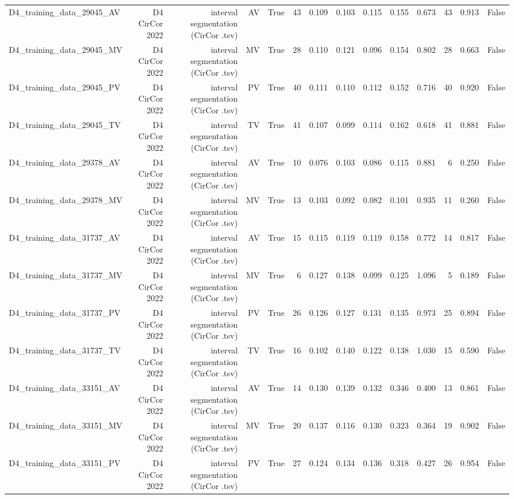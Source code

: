 \begin{table}[htbp]
\begin{tabular}{lrrrrrrrrrrrrr}
    D4\_training\_data\_29045\_AV & D4 CirCor 2022 & interval segmentation (CirCor .tsv) & AV & True & 43 & 0.109 & 0.103 & 0.115 & 0.155 & 0.673 & 43 & 0.913 & False \\
    D4\_training\_data\_29045\_MV & D4 CirCor 2022 & interval segmentation (CirCor .tsv) & MV & True & 28 & 0.110 & 0.121 & 0.096 & 0.154 & 0.802 & 28 & 0.663 & False \\
    D4\_training\_data\_29045\_PV & D4 CirCor 2022 & interval segmentation (CirCor .tsv) & PV & True & 40 & 0.111 & 0.110 & 0.112 & 0.152 & 0.716 & 40 & 0.920 & False \\
    D4\_training\_data\_29045\_TV & D4 CirCor 2022 & interval segmentation (CirCor .tsv) & TV & True & 41 & 0.107 & 0.099 & 0.114 & 0.162 & 0.618 & 41 & 0.881 & False \\
    D4\_training\_data\_29378\_AV & D4 CirCor 2022 & interval segmentation (CirCor .tsv) & AV & True & 10 & 0.076 & 0.103 & 0.086 & 0.115 & 0.881 & 6 & 0.250 & False \\
    D4\_training\_data\_29378\_MV & D4 CirCor 2022 & interval segmentation (CirCor .tsv) & MV & True & 13 & 0.103 & 0.092 & 0.082 & 0.101 & 0.935 & 11 & 0.260 & False \\
    D4\_training\_data\_31737\_AV & D4 CirCor 2022 & interval segmentation (CirCor .tsv) & AV & True & 15 & 0.115 & 0.119 & 0.119 & 0.158 & 0.772 & 14 & 0.817 & False \\
    D4\_training\_data\_31737\_MV & D4 CirCor 2022 & interval segmentation (CirCor .tsv) & MV & True & 6 & 0.127 & 0.138 & 0.099 & 0.125 & 1.096 & 5 & 0.189 & False \\
    D4\_training\_data\_31737\_PV & D4 CirCor 2022 & interval segmentation (CirCor .tsv) & PV & True & 26 & 0.126 & 0.127 & 0.131 & 0.135 & 0.973 & 25 & 0.894 & False \\
    D4\_training\_data\_31737\_TV & D4 CirCor 2022 & interval segmentation (CirCor .tsv) & TV & True & 16 & 0.102 & 0.140 & 0.122 & 0.138 & 1.030 & 15 & 0.590 & False \\
    D4\_training\_data\_33151\_AV & D4 CirCor 2022 & interval segmentation (CirCor .tsv) & AV & True & 14 & 0.130 & 0.139 & 0.132 & 0.346 & 0.400 & 13 & 0.861 & False \\
    D4\_training\_data\_33151\_MV & D4 CirCor 2022 & interval segmentation (CirCor .tsv) & MV & True & 20 & 0.137 & 0.116 & 0.130 & 0.323 & 0.364 & 19 & 0.902 & False \\
    D4\_training\_data\_33151\_PV & D4 CirCor 2022 & interval segmentation (CirCor .tsv) & PV & True & 27 & 0.124 & 0.134 & 0.136 & 0.318 & 0.427 & 26 & 0.954 & False \\

\end{tabular}
\end{table}
